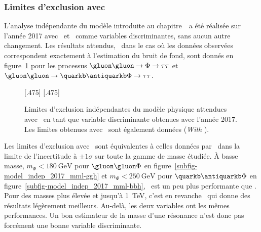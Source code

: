 \subsubsection{Limites d'exclusion avec \mml}
L'analyse indépendante du modèle introduite au chapitre~\ a été réalisée
sur l'année 2017
avec \mTtot\ et \mml\ comme variables discriminantes,
sans aucun autre changement.
Les résultats attendus,
\ie\ dans le cas où les données observées correspondent exactement à l'estimation du bruit de fond,
sont donnés en figure~\ref{fig-model_indep_2017_mml}
pour les processus $\gluon\gluon\to\Phi\to\tau\tau$ et $\gluon\gluon\to\quarkb\antiquarkb\Phi\to\tau\tau$.
\begin{figure}[h]
\centering

[.475\textwidth]
{}
\hfill
{}[.475\textwidth]
{}


\caption[Limites d'exclusion indépendantes avec \mml\ en 2017.]{Limites d'exclusion indépendantes du modèle physique attendues avec \mml\ en tant que variable discriminante obtenues avec l'année 2017. Les limites obtenues avec \mTtot\ sont également données (\emph{With \mTtot}).}
\label{fig-model_indep_2017_mml}
\end{figure}
\par
Les limites d'exclusion avec \mml\ sont équivalentes à celles données par \mTtot\
dans la limite de l'incertitude à $\pm1\sigma$
sur toute la gamme de masse étudiée.
À basse masse,
$m_\Phi<\SI{180}{\GeV}$ pour $\gluon\gluon\Phi$ en figure~\ref{subfig-model_indep_2017_mml-ggh}
et
$m_\Phi<\SI{250}{\GeV}$ pour $\quarkb\antiquarkb\Phi$ en figure~\ref{subfig-model_indep_2017_mml-bbh},
\mml\ est un peu plus performante que \mTtot.
Pour des masses plus élevée et jusqu'à \SI{1}{\TeV},
c'est en revanche \mTtot\ qui donne des résultats légèrement meilleurs.
Au-delà, les deux variables ont les mêmes performances.
Un bon estimateur de la masse d'une résonance n'est donc pas forcément une bonne variable discriminante.

